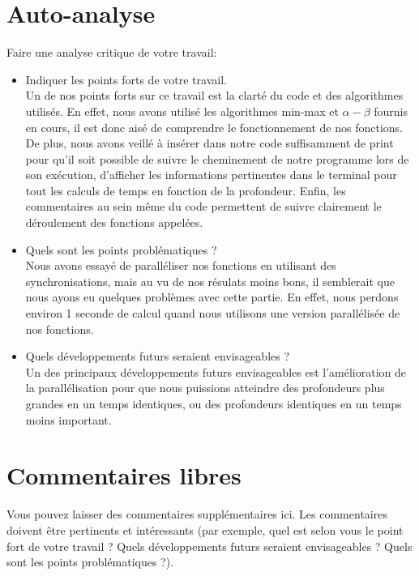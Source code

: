 \documentclass[a4paper, 11pt]{article}
\begin{document}
\section{Auto-analyse}

Faire une analyse critique de votre travail:\\
\begin{itemize}
\item Indiquer les points forts de votre travail. \\
  Un de nos points forts sur ce travail est la clarté du code et des algorithmes utilisés. En effet, nous avons utilisé les algorithmes min-max et $\alpha-\beta$ fournis en cours, il est donc aisé de comprendre le fonctionnement de nos fonctions. De plus, nous avons veillé à insérer dans notre code suffisamment de print pour qu'il soit possible de suivre le cheminement de notre programme lors de son exécution, d'afficher les informations pertinentes dans le terminal pour tout les calculs de temps en fonction de la profondeur. Enfin, les commentaires au sein même du code permettent de suivre clairement le déroulement des fonctions appelées.
\vspace{1cm}
\item Quels sont les points problématiques ? \\
  Nous avons essayé de paralléliser nos fonctions en utilisant des synchronisations, mais au vu de nos résulats moins bons, il semblerait que nous ayons eu quelques problèmes avec cette partie. En effet, nous perdons environ 1 seconde de calcul quand nous utilisons une version parallélisée de nos fonctions.  
\vspace{1cm}
\item Quels développements futurs seraient envisageables ? \\
  Un des principaux développements futurs envisageables est l'amélioration de la parallélisation pour que nous puissions atteindre des profondeurs plus grandes en un temps identiques, ou des profondeurs identiques en un temps moins important.
\end{itemize}


\section{Commentaires libres}

Vous pouvez laisser des commentaires supplémentaires ici. Les commentaires
doivent être pertinents et intéressants (par exemple, quel est selon vous
le point fort de votre travail ? Quels développements futurs seraient
envisageables ? Quels sont les points problématiques ?).
\end{document}
